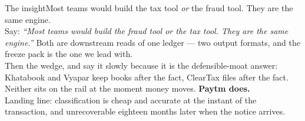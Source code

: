 \documentclass[aspectratio=169,10pt]{beamer}
\begin{document}
\begin{frame}{The insight}{Most teams would build the tax tool \emph{or} the fraud tool. They are the same engine.}
{\\[0.4em]
Say: \emph{``Most teams would build the fraud tool or the tax tool. They are the
same engine.''} Both are downstream reads of one ledger --- two output formats,
and the freeze pack is the one we lead with.
\\[0.4em]
Then the wedge, and say it slowly because it is the defensible-moat answer:
Khatabook and Vyapar keep books after the fact, ClearTax files after the fact.
Neither sits on the rail at the moment money moves. \textbf{Paytm does.}
\\[0.4em]
Landing line: classification is cheap and accurate at the instant of the
transaction, and unrecoverable eighteen months later when the notice arrives.}
\end{frame}

\end{document}
